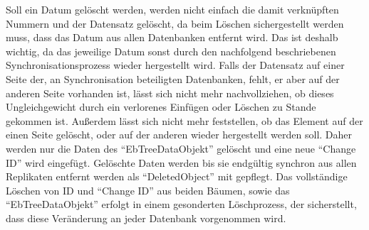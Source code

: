 \documentclass[a4paper,11pt,oneside,%
headsepline,												%
footsepline,												%
bibtotocnumbered									%
]{scrreprt}
\begin{document}
Soll ein Datum gelöscht werden, werden nicht einfach die damit verknüpften Nummern und der Datensatz gelöscht, da beim Löschen sichergestellt werden muss, dass das Datum aus allen Datenbanken entfernt wird. Das ist deshalb wichtig, da das jeweilige Datum sonst durch den nachfolgend beschriebenen Synchronisationsprozess wieder hergestellt wird. Falls der Datensatz auf einer Seite der, an Synchronisation beteiligten Datenbanken, fehlt, er aber auf der anderen Seite vorhanden ist, lässt sich nicht mehr nachvollziehen, ob dieses Ungleichgewicht durch ein verlorenes Einfügen oder Löschen zu Stande gekommen ist. Außerdem lässt sich nicht mehr feststellen, ob das Element auf der einen Seite gelöscht, oder auf der anderen wieder hergestellt werden soll. Daher werden nur die Daten des \enquote{EbTreeDataObjekt} gelöscht und eine neue \enquote{Change ID} wird eingefügt. Gelöschte Daten werden bis sie endgültig synchron aus allen Replikaten entfernt werden als \enquote{DeletedObject} mit gepflegt. Das vollständige Löschen von ID und \enquote{Change ID} aus beiden Bäumen, sowie das \enquote{EbTreeDataObjekt} erfolgt in einem gesonderten Löschprozess, der sicherstellt, dass diese Veränderung an jeder Datenbank vorgenommen wird.
\end{document}
